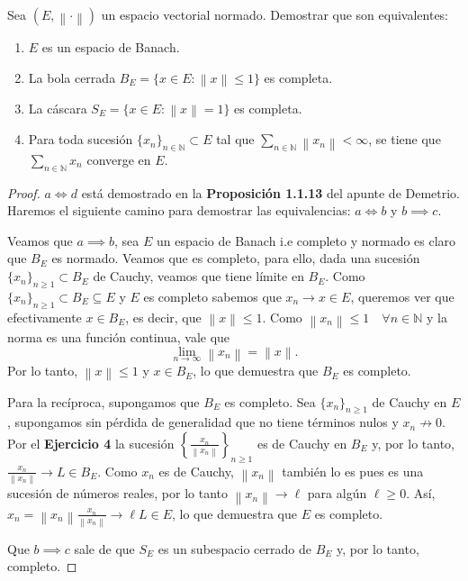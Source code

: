 \documentclass{article}
\theoremstyle{definition}
\newcommand{\N}{\mathbb{N}}
\newcommand{\norm}[1]{\left\lVert #1 \right\rVert}       %
\newcommand{\EN}[1][E]{(#1,\norm{\cdot})}                 %
\newenvironment{ejercicio}[1]{\begin{trivlist}
\item[\hskip \labelsep {\bfseries Ejercicio}\hskip \labelsep {\bfseries #1.}]}{\end{trivlist}}
\begin{document}
\begin{ejercicio}{6}
    Sea \( \EN \) un espacio vectorial normado. Demostrar que son equivalentes:
    \begin{enumerate}
        \item[(a)] \(E\) es un espacio de Banach.
        \item[(b)] La bola cerrada \(B_E=\{x\in E:\norm{x}\leq 1\} \) es completa.
        \item[(c)] La cáscara \( S_E=\{x\in E:\norm{x}=1\} \) es completa.
        \item[(d)] Para toda sucesión \( {\{x_n\}}_{n\in\N}\subset E\) tal que \( \sum_{n\in\N} \norm{x_n} < \infty \), se tiene que \(\sum_{n\in\N}x_n\) converge en \(E\).
    \end{enumerate}
\end{ejercicio}
\begin{proof}
    \( a \iff d \) está demostrado en la \textbf{Proposición 1.1.13} del apunte de Demetrio. Haremos el siguiente camino para demostrar las equivalencias: \( a \iff b \) y \( b \implies c \).

    Veamos que \( a \implies b \), sea \( E \) un espacio de Banach i.e completo y normado es claro que \( B_E \) es normado. Veamos que es completo, para ello, dada una sucesión \( { \{ x_n \} }_{n\geq 1} \subset B_E \) de Cauchy, veamos que tiene límite en \( B_E \). Como \( { \{ x_n \} }_{n\geq1} \subset B_E \subseteq E \) y \( E \) es completo sabemos que \( x_n \to x \in E \), queremos ver que efectivamente \( x \in B_E \), es decir, que \( \norm{x} \leq 1 \).
    Como \( \norm{x_n} \leq 1 \quad \forall n \in \N \) y la norma es una función continua, vale que \[
        \lim_{n \to \infty} \norm{x_n} = \norm{x}.
    \]
    Por lo tanto, \( \norm{x} \leq 1 \) y \( x \in B_E \), lo que demuestra que \( B_E \) es completo.

    Para la recíproca, supongamos que \( B_E \) es completo. Sea \( {\{ x_n \}}_{n \geq 1} \) de Cauchy en \( E \), supongamos sin pérdida de generalidad que no tiene términos nulos y \( x_n \not \to 0 \). Por el \textbf{Ejercicio 4} la sucesión \( {\left \{ \frac{x_n}{\norm{x_n}} \right \}}_{n\geq1} \) es de Cauchy en \( B_E \) y, por lo tanto, \( \frac{x_n}{\norm{x_n}} \to L \in B_E \).
    Como \( x_n \) es de Cauchy, \( \norm{x_n} \) también lo es pues es una sucesión de números reales, por lo tanto \( \norm{x_n} \to \ell \) para algún \( \ell \geq 0 \). Así, \( x_n = \norm{x_n} \frac{x_n}{\norm{x_n}} \to \ell L \in E \), lo que demuestra que \( E \) es completo.

    Que \( b \implies c \) sale de que \( S_E \) es un subespacio cerrado de \( B_E \) y, por lo tanto, completo.
\end{proof}
\end{document}
